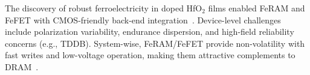 
The discovery of robust ferroelectricity in doped HfO$_2$ films enabled FeRAM and FeFET
with CMOS-friendly back-end integration~\cite{boscke2011,mueller2012}. Device-level challenges
include polarization variability, endurance dispersion, and high-field reliability concerns
(e.g., TDDB). System-wise, FeRAM/FeFET provide non-volatility with fast writes and low-voltage
operation, making them attractive complements to DRAM~\cite{noheda2023,martin2020}.
